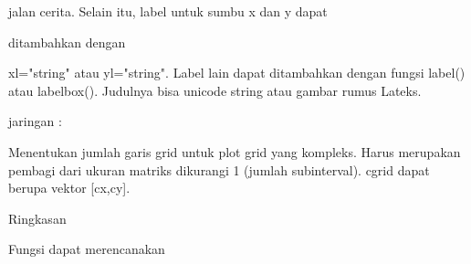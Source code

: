\documentclass{article}
\begin{document}
\begin{eulernotebook}
\begin{eulercomment}
\begin{eulercomment}
\begin{eulercomment}
\begin{eulercomment}
\begin{eulercomment}
\begin{eulercomment}
\begin{eulercomment}
\begin{eulercomment}
\begin{eulercomment}
\begin{eulercomment}
\begin{eulercomment}
\begin{eulercomment}
\begin{eulercomment}
\begin{eulercomment}
\begin{eulercomment}
\begin{eulercomment}
\begin{eulercomment}
\begin{eulercomment}
\begin{eulercomment}
\begin{eulercomment}
\begin{eulercomment}
\begin{eulercomment}
\begin{eulercomment}
\begin{eulercomment}
\begin{eulercomment}
\begin{eulercomment}
\begin{eulercomment}
\begin{eulercomment}
\begin{eulerttcomment}
  jalan cerita. Selain itu, label untuk sumbu x dan y dapat
\end{eulerttcomment}
\begin{eulercomment}
ditambahkan dengan\\
\end{eulercomment}
\begin{eulerttcomment}
  xl="string" atau yl="string". Label lain dapat ditambahkan dengan
  fungsi label() atau labelbox(). Judulnya bisa unicode
  string atau gambar rumus Lateks.
\end{eulerttcomment}
\begin{eulercomment}
jaringan     :\\
\end{eulercomment}
\begin{eulerttcomment}
  Menentukan jumlah garis grid untuk plot grid yang kompleks.
  Harus merupakan pembagi dari ukuran matriks dikurangi 1 (jumlah
  subinterval). cgrid dapat berupa vektor [cx,cy].
\end{eulerttcomment}
\begin{eulercomment}

\end{eulercomment}
\begin{eulerttcomment}
 Ringkasan
\end{eulerttcomment}
\begin{eulercomment}

\end{eulercomment}
\begin{eulerttcomment}
 Fungsi dapat merencanakan
\end{eulerttcomment}
\begin{eulercomment}


\end{eulercomment}
\end{eulercomment}
\end{eulercomment}
\end{eulercomment}
\end{eulercomment}
\end{eulercomment}
\end{eulercomment}
\end{eulercomment}
\end{eulercomment}
\end{eulercomment}
\end{eulercomment}
\end{eulercomment}
\end{eulercomment}
\end{eulercomment}
\end{eulercomment}
\end{eulercomment}
\end{eulercomment}
\end{eulercomment}
\end{eulercomment}
\end{eulercomment}
\end{eulercomment}
\end{eulercomment}
\end{eulercomment}
\end{eulercomment}
\end{eulercomment}
\end{eulercomment}
\end{eulercomment}
\end{eulercomment}
\end{eulercomment}
\end{eulernotebook}
\end{document}
